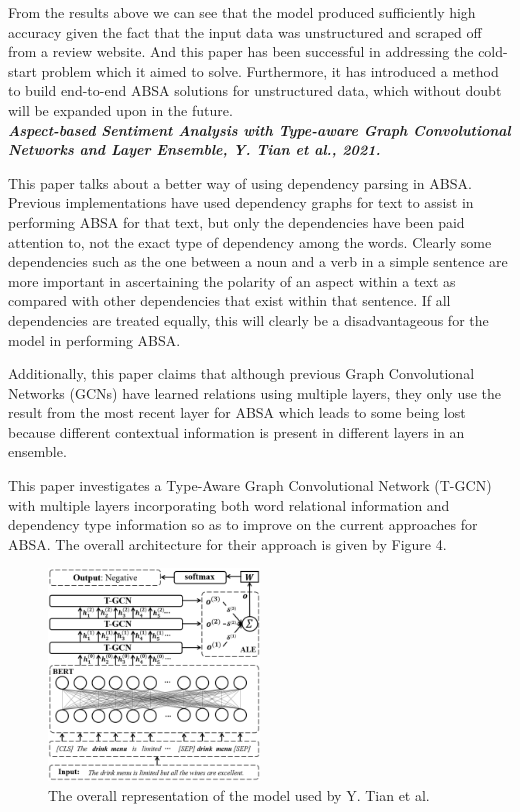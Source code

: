 \documentclass[conference]{IEEEtran}
\begin{document}
From the results above we can see that the model produced sufficiently high accuracy given the fact that the input data was unstructured and scraped off from a review website. And this paper has been successful in addressing the cold-start problem which it aimed to solve. Furthermore, it has introduced a method to build end-to-end ABSA solutions for unstructured data, which without doubt will be expanded upon in the future.\\

\textit{\textbf{Aspect-based Sentiment Analysis with
Type-aware Graph Convolutional Networks and Layer Ensemble, Y. Tian et al., 2021.}}

This paper talks about a better way of using dependency parsing in ABSA. Previous implementations have used dependency graphs for text to assist in performing ABSA for that text, but only the dependencies have been paid attention to, not the exact type of dependency among the words. Clearly some dependencies such as the one between a noun and a verb in a simple sentence are more important in ascertaining the polarity of an aspect within a text as compared with other dependencies that exist within that sentence. If all dependencies are treated equally, this will clearly be a disadvantageous for the model in performing ABSA.

Additionally, this paper claims that although previous Graph Convolutional Networks (GCNs) have learned relations using multiple layers, they only use the result from the most recent layer for ABSA which leads to some being lost because different contextual information is present in different layers in an ensemble.

This paper investigates a Type-Aware Graph Convolutional Network (T-GCN) with multiple layers incorporating both word relational information and dependency type information so as to improve on the current approaches for ABSA. The overall architecture for their approach is given by Figure 4.

\begin{figure}[htbp]
\centerline{\includegraphics[keepaspectratio, width=0.5\textwidth]{pics/4.png}}
\caption{The overall representation of the model used by Y. Tian et al.}
\label{fig}
\end{figure}
\end{document}
